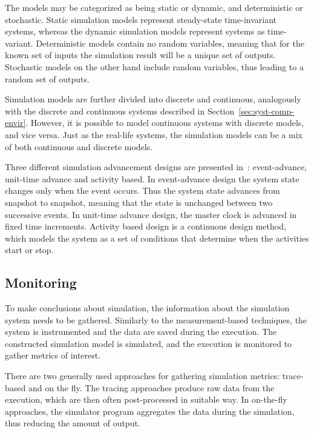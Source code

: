 The models may be categorized as being static or dynamic, and deterministic or stochastic. Static simulation models represent steady-state time-invariant systems, whereas the dynamic simulation models represent systems as time-variant. Deterministic models contain no random variables, meaning that for the known set of inputs the simulation result will be a unique set of outputs. Stochastic models on the other hand include random variables, thus leading to a random set of outputs.~\cite{Banks:2010:DES}

Simulation models are further divided into discrete and continuous, analogously with the discrete and continuous systems described in Section~\ref{sec:syst-comp-envir}. However, it is possible to model continuous systems with discrete models, and vice versa. Just as the real-life systems, the simulation models can be a mix of both continuous and discrete models.~\cite{Banks:2010:DES}

Three different simulation advancement designs are presented in~\cite{peros:2009:simulation}: event-advance, unit-time advance and activity based. In event-advance design the system state changes only when the event occurs. Thus the system state advances from snapshot to snapshot, meaning that the state is unchanged between two successive events. In unit-time advance design, the master clock is advanced in fixed time increments. Activity based design is a continuous design method, which models the system as a set of conditions that determine when the activities start or stop.~\cite{peros:2009:simulation}

\subsection{Monitoring}
To make conclusions about simulation, the information about the simulation system needs to be gathered. Similarly to the measurement-based techniques, the system is instrumented and the data are saved during the execution. The constructed simulation model is simulated, and the execution is monitored to gather metrics of interest.~\cite{jain:1991:AOCSPA, peros:2009:simulation}

There are two generally used approaches for gathering simulation metrics: trace-based and on the fly. The tracing approaches produce raw data from the execution, which are then often post-processed in suitable way. In on-the-fly approaches, the simulator program aggregates the data during the simulation, thus reducing the amount of output.~\cite{jain:1991:AOCSPA, peros:2009:simulation}

